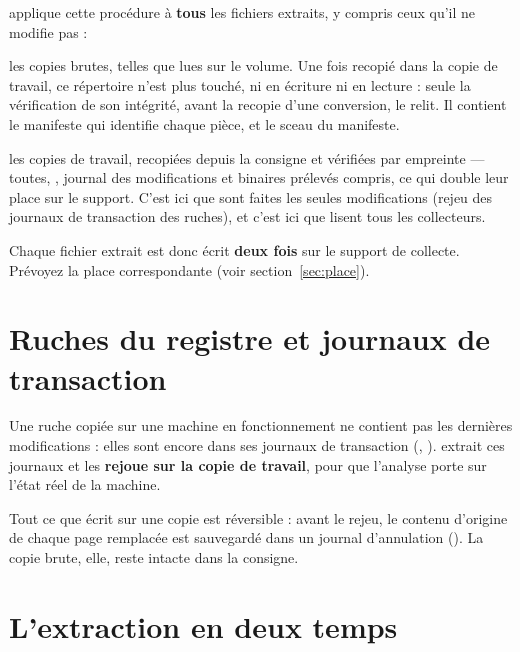 \documentclass[11pt,a4paper,oneside]{report}
\begin{document}
\wac{} applique cette procédure à \textbf{tous} les fichiers extraits, y compris
ceux qu'il ne modifie pas :

\begin{description}[style=nextline,leftmargin=1.2em]
  \item[\fichier{exhibits/}] les copies brutes, telles que lues sur le volume. Une
        fois recopié dans la copie de travail, ce répertoire n'est plus touché,
        ni en écriture ni en lecture : seule la vérification de son intégrité,
        avant la recopie d'une conversion, le relit. Il contient le manifeste
        qui identifie chaque pièce, et le sceau du manifeste.
  \item[\fichier{working/}] les copies de travail, recopiées depuis la consigne
        et vérifiées par empreinte — toutes, , journal des
        modifications et binaires prélevés compris, ce qui double leur place sur
        le support. C'est ici que sont faites les seules modifications (rejeu
        des journaux de transaction des ruches), et c'est ici que lisent tous
        les collecteurs.
\end{description}

\begin{note}
Chaque fichier extrait est donc écrit \textbf{deux fois} sur le support de
collecte. Prévoyez la place correspondante (voir
section~\ref{sec:place}).
\end{note}

\section{Ruches du registre et journaux de transaction}

Une ruche copiée sur une machine en fonctionnement ne contient pas les dernières
modifications : elles sont encore dans ses journaux de transaction
(, ). \wac{} extrait ces journaux et les
\textbf{rejoue sur la copie de travail}, pour que l'analyse porte sur l'état réel
de la machine.

Tout ce que \wac{} écrit sur une copie est réversible : avant le rejeu, le contenu
d'origine de chaque page remplacée est sauvegardé dans un journal d'annulation
(). La copie brute, elle, reste intacte dans la consigne.

\section{L'extraction en deux temps}
\end{document}
